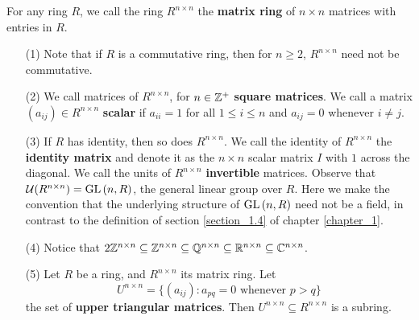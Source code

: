\begin{definition}
    For any ring $R$, we call the ring  $R^{n \times n}$ the  \textbf{matrix
    ring} of $n \times n$ matrices with entries in $R$.
\end{definition}

\begin{example}\label{example_5.7}
    \begin{enumerate}
        \item[(1)] Note that if $R$ is a commutative ring, then for $n \geq 2$,
            $R^{n \times n}$ need not be commutative.

        \item[(2)] We call matrices of $R^{n \times n}$, for $n \in \mathbb{Z}^+$
            \textbf{square matrices}. We call a matrix $(a_{ij}) \in R^{n \times
            n}$ \textbf{scalar} if $a_{ii}=1$ for all $1 \leq i \leq n$ and
            $a_{ij}=0$ whenever $i \neq j$.

        \item[(3)] If $R$ has identity, then so does  $R^{n \times n}$. We call
            the identity of $R^{n \times n}$ the \textbf{identity matrix} and
            denote it as the $n \times n$ scalar matrix  $I$ with $1$ across the
            diagonal. We call the units of $R^{n \times n}$ \textbf{invertible}
            matrices. Observe that $\mathcal{U}{(R^{n \times n})}=\operatorname{GL}{(n,R)}$,
            the general linear group over $R$. Here we make the
            convention that the underlying structure of $\operatorname{GL}{(n,R)}$
            need not be a field, in contrast to the definition of
            section \ref{section_1.4} of chapter \ref{chapter_1}.

        \item[(4)] Notice that $2\mathbb{Z}^{n \times n} \subseteq \mathbb{Z}^{n \times n}
            \subseteq \mathbb{Q}^{n \times n} \subseteq \mathbb{R}^{n \times n} \subseteq \mathbb{C}^{n
            \times n}$.

        \item[(5)] Let $R$ be a ring, and  $R^{n \times n}$ its matrix ring.
            Let
            \begin{equation*}
              U^{n \times n}=\{(a_{ij}) : a_{pq}=0 \text{ whenever } p>q\}
            \end{equation*}
            the set of \textbf{upper triangular matrices}. Then $U^{n \times n}
            \subseteq R^{n \times n}$ is a subring.
    \end{enumerate}
\end{example}

